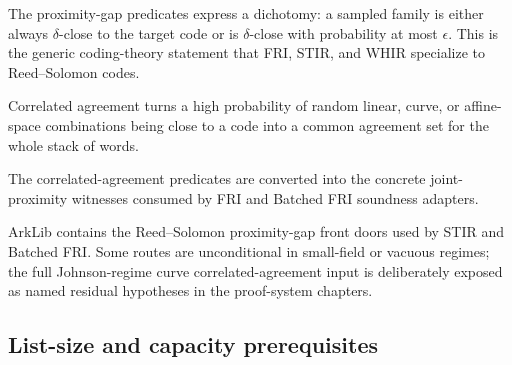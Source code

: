 \begin{definition}\label{def:proximity_gap}
    The proximity-gap predicates express a dichotomy: a sampled family is either always
    $\delta$-close to the target code or is $\delta$-close with probability at most $\epsilon$.
    This is the generic coding-theory statement that FRI, STIR, and WHIR specialize to
    Reed--Solomon codes.
\end{definition}

\begin{definition}\label{def:correlated_agreement}
    Correlated agreement turns a high probability of random linear, curve, or affine-space
    combinations being close to a code into a common agreement set for the whole stack of words.
\end{definition}

\begin{lemma}\label{lem:joint_proximity_bridges}
    The correlated-agreement predicates are converted into the concrete joint-proximity witnesses
    consumed by FRI and Batched FRI soundness adapters.
\end{lemma}

\begin{theorem}\label{thm:bciks_rs_gap}
    ArkLib contains the Reed--Solomon proximity-gap front doors used by STIR and Batched FRI.
    Some routes are unconditional in small-field or vacuous regimes; the full Johnson-regime curve
    correlated-agreement input is deliberately exposed as named residual hypotheses in the
    proof-system chapters.
\end{theorem}

\subsection{List-size and capacity prerequisites}\label{sec:list_size_prereqs}

